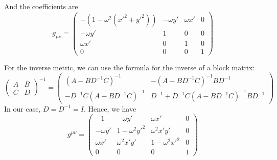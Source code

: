 \documentclass[a4paper,11pt]{article}
\begin{document}
And the coefficients are
\begin{equation}
    g_{\mu\nu} = \begin{pmatrix}
        -\left(1 - \omega^2(x'^2 + y'^2)\right) & -\omega y' & \omega x' & 0 \\
        -\omega y' & 1 & 0 & 0 \\
        \omega x' & 0 & 1 & 0 \\
        0 & 0 & 0 & 1
    \end{pmatrix}
\end{equation}

For the inverse metric, we can use the formula for the inverse of a block matrix:
\begin{equation}
    \begin{pmatrix}
        A & B \\
        C & D
    \end{pmatrix}^{-1} = \begin{pmatrix}
        (A - BD^{-1}C)^{-1} & -(A - BD^{-1}C)^{-1}BD^{-1} \\
        -D^{-1}C(A - BD^{-1}C)^{-1} & D^{-1} + D^{-1}C(A - BD^{-1}C)^{-1}BD^{-1}
    \end{pmatrix}
\end{equation}
In our case, $D=D^{-1}=I$. Hence, we have
\begin{equation}
    g^{\mu\nu} = \begin{pmatrix}
        -1 & -\omega y' & \omega x' & 0 \\
        -\omega y' & 1 - \omega^2 y'^2 & \omega^2 x'y' & 0 \\
        \omega x' & \omega^2 x'y' & 1 - \omega^2 x'^2 & 0 \\
        0 & 0 & 0 & 1
    \end{pmatrix}
\end{equation}
\end{document}
